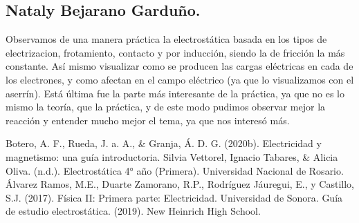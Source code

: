 \documentclass[spanish,10pt,a4paper,onecolumn]{article}
\begin{document}
\subsection{Nataly Bejarano Garduño.}
Observamos de una manera práctica la electrostática basada en los tipos de electrizacion, frotamiento, contacto y por inducción, siendo la de fricción la más constante.
Así mismo visualizar como se producen las cargas eléctricas en cada de los electrones, y como afectan en el campo eléctrico (ya que lo visualizamos con el aserrín).
Está última fue la parte más interesante de la práctica, ya que no es lo mismo la teoría, que la práctica, y de este modo pudimos observar mejor la reacción y entender mucho mejor el tema, ya que nos interesó más.

\newpage	
\begin{thebibliography}{0}
	Botero, A. F., Rueda, J. a. A., \& Granja, Á. D. G. (2020b). Electricidad y magnetismo: una guía introductoria.
	Silvia Vettorel, Ignacio Tabares, \& Alicia Oliva. (n.d.). Electrostática 4° año (Primera). Universidad Nacional de Rosario.
	 Álvarez Ramos, M.E., Duarte Zamorano, R.P., Rodríguez Jáuregui, E., y Castillo, S.J. (2017). Física II: Primera parte: Electricidad. Universidad de Sonora.
	Guía de estudio electrostática. (2019). New Heinrich High School.
\end{thebibliography}
\end{document}
